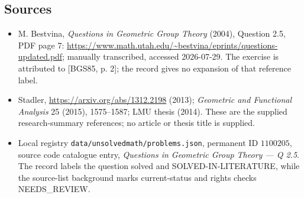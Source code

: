 \documentclass[11pt]{article}
\begin{document}
\subsection{Sources}
\begin{itemize}
\item M. Bestvina, \emph{Questions in Geometric Group Theory} (2004), Question 2.5, PDF page 7: \url{https://www.math.utah.edu/~bestvina/eprints/questions-updated.pdf}; manually transcribed, accessed 2026-07-29. The exercise is attributed to [BGS85, p. 2]; the record gives no expansion of that reference label.
\item Stadler, \url{https://arxiv.org/abs/1312.2198} (2013); \emph{Geometric and Functional Analysis} 25 (2015), 1575--1587; LMU thesis (2014). These are the supplied research-summary references; no article or thesis title is supplied.
\item Local registry \texttt{data/unsolvedmath/problems.json}, permanent ID $1100205$, source code catalogue entry, \emph{Questions in Geometric Group Theory --- Q 2.5}. The record labels the question solved and SOLVED-IN-LITERATURE, while the source-list background marks current-status and rights checks NEEDS\_REVIEW.
\end{itemize}
\end{document}
